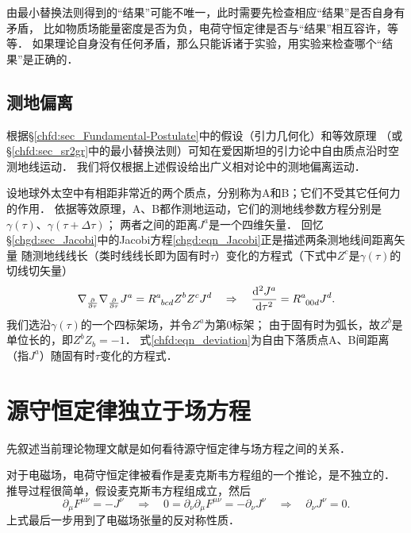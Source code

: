 由最小替换法则得到的“结果”可能不唯一，此时需要先检查相应“结果”是否自身有矛盾，
比如物质场能量密度是否为负，电荷守恒定律是否与“结果”相互容许，等等．
如果理论自身没有任何矛盾，那么只能诉诸于实验，用实验来检查哪个“结果”是正确的．


\subsection{测地偏离}\label{chfd:sec_GDTF}
根据\S\ref{chfd:sec_Fundamental-Postulate}中的假设（引力几何化）和等效原理
（或\S\ref{chfd:sec_sr2gr}中的最小替换法则）可知在爱因斯坦的引力论中自由质点沿时空测地线运动．
我们将仅根据上述假设给出广义相对论中的测地偏离运动．


设地球外太空中有相距非常近的两个质点，分别称为A和B；它们不受其它任何力的作用．
依据等效原理，A、B都作测地运动，它们的测地线参数方程分别是$\gamma(\tau)$、$\gamma(\tau+\Delta\tau)$；
两者之间的距离$J^a$是一个四维矢量．
回忆\S\ref{chgd:sec_Jacobi}中的Jacobi方程\eqref{chgd:eqn_Jacobi}正是描述两条测地线间距离矢量
随测地线线长（类时线线长即为固有时$\tau$）变化的方程式（下式中$Z^c$是$\gamma(\tau)$的切线切矢量）
\begin{equation}\label{chfd:eqn_deviation}
	\nabla_{\frac{\partial}{\partial \tau}} \nabla_{\frac{\partial}{\partial \tau}}{J}^a 
	=R^{a}_{\hphantom{a} bcd} {Z}^b {Z}^c{J}^d 
	\quad \Rightarrow \quad
	\frac{{\rm d}^2 J^a}{{\rm d} \tau^2}=R^{a}_{\hphantom{a} 00d} {J}^d. 
\end{equation}
我们选沿$\gamma(\tau)$的一个四标架场，并令$Z^a$为第$0$标架；
由于固有时为弧长，故$Z^b$是单位长的，即$Z^b Z_b=-1$．
式\eqref{chfd:eqn_deviation}为自由下落质点A、B间距离（指$J^a$）随固有时$\tau$变化的方程式．



\section{源守恒定律独立于场方程}\label{chfd:sec_liu2018}
先叙述当前理论物理文献是如何看待源守恒定律与场方程之间的关系．

对于电磁场，电荷守恒定律被看作是麦克斯韦方程组的一个推论，是不独立的．
推导过程很简单，假设麦克斯韦方程组成立，然后
\begin{equation}
    \partial_\mu F^{\mu\nu} = -J^\nu \quad \Rightarrow \quad
    0=\partial_\nu\partial_\mu F^{\mu\nu} = -\partial_\nu J^\nu
    \quad \Rightarrow \quad \partial_\nu J^\nu =0.
\end{equation}
上式最后一步用到了电磁场张量的反对称性质．

